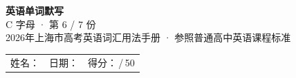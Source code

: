 \documentclass[10pt,a4paper]{article}
\begin{document}
\pagestyle{plain}

\begin{center}
{\LARGE\bfseries 英语单词默写}\\[0.22em]
{\large C 字母 · 第 6 / 7 份}\\[0.18em]
{\small 2026年上海市高考英语词汇用法手册 · 参照普通高中英语课程标准}
\end{center}

\vspace{0.25em}
\noindent\begin{tabular}{@{}p{}@{}p{}@{}p{}@{}}
姓名：\underline{\hspace{2.0cm}} & 日期：\underline{\hspace{2.0cm}} & 得分：\underline{\hspace{1.3cm}}\,/\,50 \\
\end{tabular}

\vspace{0.3em}

\vspace{0.08em}
\end{document}
